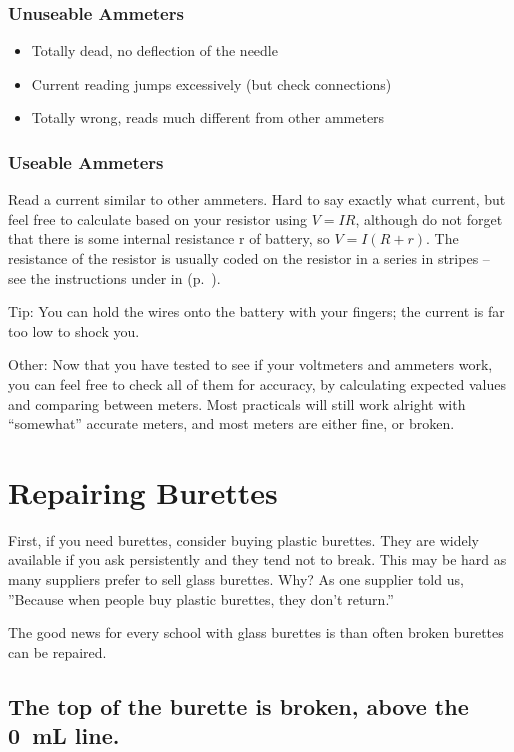 \subsubsection{Unuseable Ammeters} 	
\begin{itemize}
\item{Totally dead, 
no deflection of the needle}
\item{Current reading jumps excessively (but check connections)}
\item{Totally wrong, 
reads much different from other ammeters}
\end{itemize}

\subsubsection{Useable Ammeters}
Read a current similar to other ammeters. 
Hard to say exactly what current, 
but feel free to calculate based on your resistor using $ V=IR $, 
although do not forget that there is 
some internal resistance r of battery, 
so $ V=I(R+r) $. 
The resistance of the resistor is usually coded 
on the resistor in a series in stripes -- 
see the instructions under  in  (p.~\pageref{sec:resistors}).

Tip: You can hold the wires onto the battery with your fingers; 
the current is far too low to shock you.

Other: Now that you have tested to see 
if your voltmeters and ammeters work, 
you can feel free to check all of them for accuracy, 
by calculating expected values and comparing between meters. 
Most practicals will still work alright with ``somewhat'' accurate meters, 
and most meters are either fine, 
or broken.


\section{Repairing Burettes} 
\label{cha:burettes}

First, if you need burettes, consider buying plastic burettes. They are widely available if you ask persistently and they tend not to break. This may be hard as many suppliers prefer to sell glass burettes. Why? As one supplier told us, ''Because when people buy plastic burettes, they don’t return.''

The good news for every school with glass burettes is than often broken burettes can be repaired.

\subsection{The top of the burette is broken, 
above the 0~mL line.}

